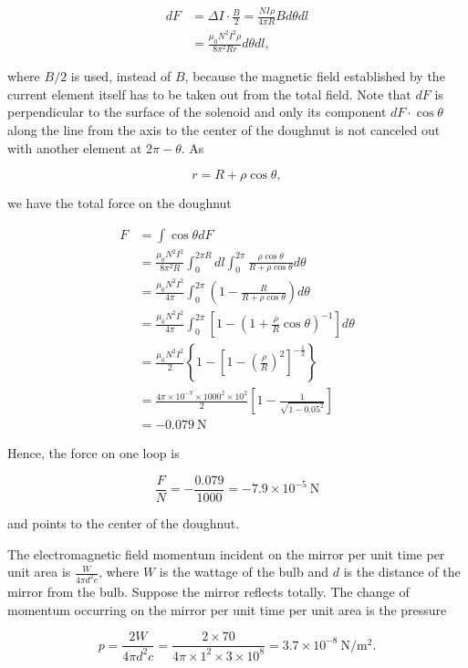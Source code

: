\documentclass[10pt]{article}
\begin{document}
$$
\begin{aligned}
d F &=\Delta I \cdot \frac{B}{2}=\frac{N I \rho}{4 \pi R} B d \theta d l \\
&=\frac{\mu_{0} N^{2} I^{2} \rho}{8 \pi^{2} R r} d \theta d l,
\end{aligned}
$$

where $B / 2$ is used, instead of $B$, because the magnetic field established by the current element itself has to be taken out from the total field. Note that $d F$ is perpendicular to the surface of the solenoid and only its component $d F \cdot \cos \theta$ along the line from the axis to the center of the doughnut is not canceled out with another element at $2 \pi-\theta$. As

$$
r=R+\rho \cos \theta,
$$

we have the total force on the doughnut

$$
\begin{aligned}
F &=\int \cos \theta d F \\
&=\frac{\mu_{0} N^{2} I^{2}}{8 \pi^{2} R} \int_{0}^{2 \pi R} d l \int_{0}^{2 \pi} \frac{\rho \cos \theta}{R+\rho \cos \theta} d \theta \\
&=\frac{\mu_{0} N^{2} I^{2}}{4 \pi} \int_{0}^{2 \pi}\left(1-\frac{R}{R+\rho \cos \theta}\right) d \theta \\
&=\frac{\mu_{0} N^{2} I^{2}}{4 \pi} \int_{0}^{2 \pi}\left[1-\left(1+\frac{\rho}{R} \cos \theta\right)^{-1}\right] d \theta \\
&=\frac{\mu_{0} N^{2} I^{2}}{2}\left\{1-\left[1-\left(\frac{\rho}{R}\right)^{2}\right]^{-\frac{1}{2}}\right\} \\
&=\frac{4 \pi \times 10^{-7} \times 1000^{2} \times 10^{2}}{2}\left[1-\frac{1}{\sqrt{1-0.05^{2}}}\right] \\
&=-0.079 \mathrm{~N}
\end{aligned}
$$

Hence, the force on one loop is

$$
\frac{F}{N}=-\frac{0.079}{1000}=-7.9 \times 10^{-5} \mathrm{~N}
$$

and points to the center of the doughnut.

 The electromagnetic field momentum incident on the mirror per unit time per unit area is $\frac{W}{4 \pi d^{2} c}$, where $W$ is the wattage of the bulb and $d$ is the distance of the mirror from the bulb. Suppose the mirror reflects totally. The change of momentum occurring on the mirror per unit time per unit area is the pressure

$$
p=\frac{2 W}{4 \pi d^{2} c}=\frac{2 \times 70}{4 \pi \times 1^{2} \times 3 \times 10^{8}}=3.7 \times 10^{-8} \mathrm{~N} / \mathrm{m}^{2} .
$$
\end{document}
